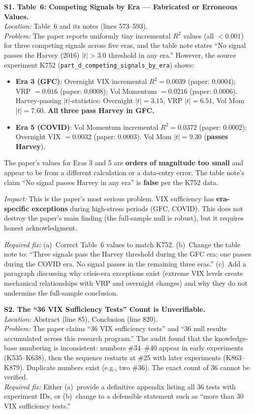 \documentclass[12pt,a4paper]{article}
\begin{document}
\textbf{S1. Table~6: Competing Signals by Era --- Fabricated or Erroneous Values.}\\
\textit{Location:} Table~6 and its notes (lines 573--593).\\
\textit{Problem:} The paper reports uniformly tiny incremental $R^2$ values (all $<0.001$) for three competing signals across five eras, and the table note states ``No signal passes the Harvey (2016) $|t|>3.0$ threshold in any era.'' However, the source experiment K752 (\texttt{part\_d\_competing\_signals\_by\_era}) shows:

\begin{itemize}
\item \textbf{Era 3 (GFC)}: Overnight VIX incremental $R^2 = 0.0039$ (paper: 0.0004); VRP $= 0.016$ (paper: 0.0008); Vol Momentum $= 0.0216$ (paper: 0.0006). Harvey-passing $|t|$-statistics: Overnight $|t|=3.15$, VRP $|t|=6.51$, Vol Mom $|t|=7.60$. \textbf{All three pass Harvey in GFC.}
\item \textbf{Era 5 (COVID)}: Vol Momentum incremental $R^2 = 0.0372$ (paper: 0.0002); Overnight VIX $= 0.0032$ (paper: 0.0003). Vol Mom $|t|=9.30$ (\textbf{passes Harvey}).
\end{itemize}

The paper's values for Eras 3 and 5 are \textbf{orders of magnitude too small} and appear to be from a different calculation or a data-entry error. The table note's claim ``No signal passes Harvey in any era'' is \textbf{false} per the K752 data.

\textit{Impact:} This is the paper's most serious problem. VIX sufficiency has \textbf{era-specific exceptions} during high-stress periods (GFC, COVID). This does not destroy the paper's main finding (the full-sample null is robust), but it requires honest acknowledgment.

\textit{Required fix:} (a)~Correct Table~6 values to match K752. (b)~Change the table note to: ``Three signals pass the Harvey threshold during the GFC era; one passes during the COVID era. No signal passes in the remaining three eras.'' (c)~Add a paragraph discussing why crisis-era exceptions exist (extreme VIX levels create mechanical relationships with VRP and overnight changes) and why they do not undermine the full-sample conclusion.

\bigskip

\textbf{S2. The ``36 VIX Sufficiency Tests'' Count is Unverifiable.}\\
\textit{Location:} Abstract (line 85), Conclusion (line 820).\\
\textit{Problem:} The paper claims ``36 VIX sufficiency tests'' and ``36 null results accumulated across this research program.'' The audit found that the knowledge-base numbering is inconsistent: numbers \#34--\#40 appear in early experiments (K535--K638), then the sequence restarts at \#25 with later experiments (K863--K879). Duplicate numbers exist (e.g., two \#36). The exact count of 36 cannot be verified.\\
\textit{Required fix:} Either (a)~provide a definitive appendix listing all 36 tests with experiment IDs, or (b)~change to a defensible statement such as ``more than 30 VIX sufficiency tests.''
\end{document}
